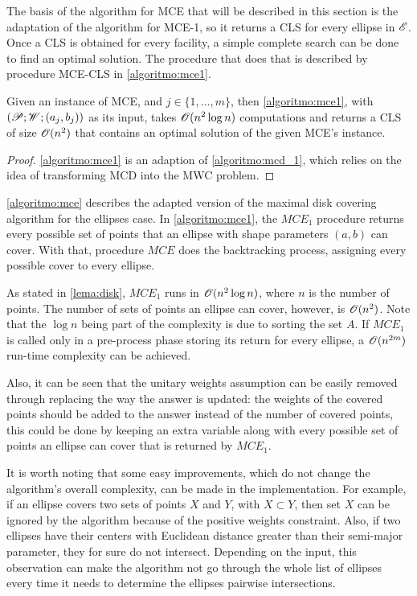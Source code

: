 The basis of the algorithm for MCE that will be described in this section is the adaptation of the algorithm for MCE-1, so it returns a CLS for every ellipse in $\mathscr{E}$. Once a CLS is obtained for every facility, a simple complete search can be done to find an optimal solution.
The procedure that does that is described by procedure MCE-CLS in \autoref{algoritmo:mce1}.

\begin{lema}
	Given an instance of MCE, and $j\in\{1, \dots, m\}$, then \autoref{algoritmo:mce1}, with $(\mathscr{P}; \mathscr{W}; (a_j,b_j))$ as its input, takes $\mathscr{O}(n^2\log{n})$ computations and returns a CLS of size $\mathscr{O}(n^2)$ that contains an optimal solution of the given MCE's instance.
\end{lema}

\begin{proof}
	\autoref{algoritmo:mce1} is an adaption of \autoref{algoritmo:mcd_1}, which relies on the idea of transforming MCD into the MWC problem.
\end{proof}

\autoref{algoritmo:mce} describes the adapted version of the maximal disk covering algorithm for the ellipses case. In \autoref{algoritmo:mce1}, the $MCE_1$ procedure returns every possible set of points that an ellipse with shape parameters $(a,b)$ can cover. With that, procedure $MCE$ does the backtracking process, assigning every possible cover to every ellipse.

As stated in \autoref{lema:disk}, $MCE_1$ runs in $\mathscr{O}(n^2\log{n})$, where $n$ is the number of points. The number of sets of points an ellipse can cover, however, is $\mathscr{O}(n^2)$. Note that the $\log{n}$ being part of the complexity is due to sorting the set $A$. If $MCE_1$ is called only in a pre-process phase storing its return for every ellipse, a $\mathscr{O}(n^{2m})$ run-time complexity can be achieved. 

Also, it can be seen that the unitary weights assumption can be easily removed through replacing the way the answer is updated: 
the weights of the covered points should be added to the answer instead of the number of covered points, this could be done by keeping an extra variable along with every possible set of points an ellipse can cover that is returned by $MCE_1$.

It is worth noting that some easy improvements, which do not change the algorithm's overall complexity, can be made in the implementation. For example, if an ellipse covers two sets of points $X$ and $Y$, with $X \subset Y$, then set $X$ can be ignored by the algorithm because of the positive weights constraint. Also, if two ellipses have their centers with Euclidean distance greater than their semi-major parameter, they for sure do not intersect. Depending on the input, this observation can make the algorithm not go through the whole list of ellipses every time it needs to determine the ellipses pairwise intersections.



